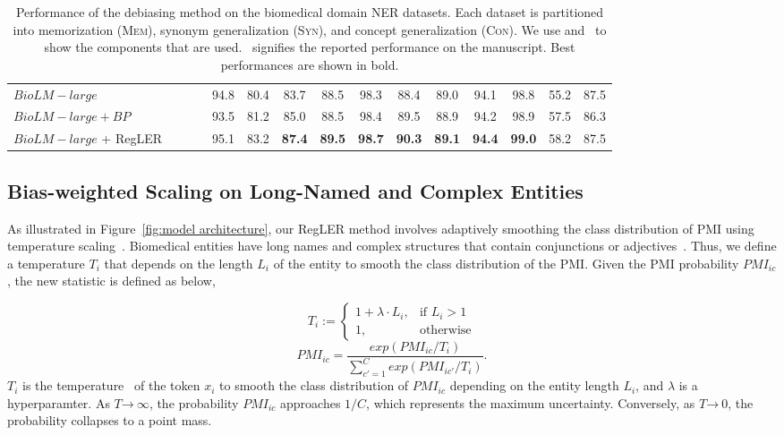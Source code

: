 \documentclass[11pt]{article}
\newcommand{\cmark}{\ding{51}}\newcommand{\xmark}{\ding{55}}\newcommand{\cross}{\ding{61}}\newcommand{\mb}[1]{\textcolor{red}{#1}}
\begin{document}
\begin{table*}[t]
\begin{adjustbox}{width=\textwidth}
\begin{tabular}{ l c c c c c c c | c c c c | c c c }
\midrule
$BioLM-large$ & \xmark & \xmark & \xmark & 94.8 & 80.4 & 83.7 & 88.5 & 98.3 & 88.4 & 89.0 & 94.1 & 98.8 & 55.2 & 87.5 \\
$BioLM-large + {BP}$ & \xmark & \xmark & \xmark & 93.5 & 81.2 & 85.0 & 88.5 & 98.4 & 89.5 & 88.9 & 94.2 & 98.9 & 57.5 & 86.3 \\
$BioLM-large$ + RegLER & \cmark & \cmark & \cmark & 95.1 & 83.2 & \textbf{87.4} & \textbf{89.5} & \textbf{98.7} & \textbf{90.3} & \textbf{89.1} & \textbf{94.4} & \textbf{99.0} & 58.2 & 87.5 \\
\bottomrule
\end{tabular}
\end{adjustbox}
\caption{Performance of the debiasing method on the biomedical domain NER datasets. Each dataset is partitioned into memorization (\textsc{Mem}), synonym generalization (\textsc{Syn}), and concept generalization (\textsc{Con}). 
We use \cmark and \xmark ~to show the components that are used. \cross ~signifies the reported performance on the manuscript. Best performances are shown in bold.}
\label{tab:maintable 1}
\end{table*}


\subsection{Bias-weighted Scaling on Long-Named and Complex Entities}
\label{sec:scaling}
As illustrated in Figure~\ref{fig:model architecture}, our RegLER method involves adaptively smoothing the class distribution of PMI using temperature scaling~\cite{guo2017calibration}.
Biomedical entities have long names and complex structures that contain conjunctions or adjectives~\cite{wei2020multichannel,cho2020combinatorial}. 
Thus, we define a temperature $T_i$ that depends on the length $L_i$ of the entity to smooth the class distribution of the PMI.
Given the PMI probability $PMI_{ic}$, the new statistic is defined as below,

\begin{equation}
    T_i := \begin{cases}
        1 + \lambda \cdot L_i, & \text{if $L_i > 1$} \\
        1, & \text{otherwise}
    \end{cases}
\end{equation}
\begin{equation}
    PMI_{ic} = \frac{exp(PMI_{ic} / T_i)}{\sum_{c'=1}^{C}exp(PMI_{ic'} / T_i)}.
\end{equation}
$T_i$ is the temperature~\cite{guo2017calibration} of the token $x_i$ to smooth the class distribution of $PMI_{ic}$ depending on the entity length $L_i$, and $\lambda$ is a hyperparamter.
As $T \text{→} ~\infty$, the probability $PMI_{ic}$ approaches $1 / C$, which represents the maximum uncertainty.
Conversely, as $T \text{→} ~ 0$, the probability collapses to a point mass.
\end{document}
